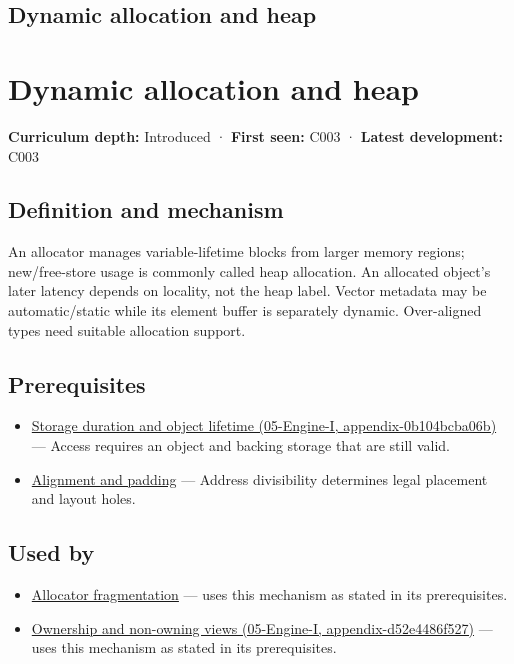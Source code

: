 \hypertarget{appendix-c3480f7d9ff3}{}
\section*{Dynamic allocation and heap}
\chapter{Dynamic allocation and heap}\label{appendix-c3480f7d9ff3-dynamic-allocation-and-heap}

\textbf{Curriculum depth:} Introduced · \textbf{First seen:} C003 · \textbf{Latest development:} C003

\section{Definition and mechanism}\label{appendix-c3480f7d9ff3-definition-and-mechanism}

An allocator manages variable-lifetime blocks from larger memory regions; new/free-store usage is commonly called heap allocation. An allocated object's later latency depends on locality, not the heap label. Vector metadata may be automatic/static while its element buffer is separately dynamic. Over-aligned types need suitable allocation support.

\section{Prerequisites}\label{appendix-c3480f7d9ff3-prerequisites}

\begin{itemize}
\tightlist
\item
  \href{../05-Engine-I/main.pdf\#nameddest=appendix-0b104bcba06b}{Storage duration and object lifetime (05-Engine-I, appendix-0b104bcba06b)} --- Access requires an object and backing storage that are still valid.
\item
  \hyperref[appendix-a1f7c53b4742]{Alignment and padding} --- Address divisibility determines legal placement and layout holes.
\end{itemize}

\section{Used by}\label{appendix-c3480f7d9ff3-used-by}

\begin{itemize}
\tightlist
\item
  \hyperref[appendix-a7c50686d81f]{Allocator fragmentation} --- uses this mechanism as stated in its prerequisites.
\item
  \href{../05-Engine-I/main.pdf\#nameddest=appendix-d52e4486f527}{Ownership and non-owning views (05-Engine-I, appendix-d52e4486f527)} --- uses this mechanism as stated in its prerequisites.
\end{itemize}

